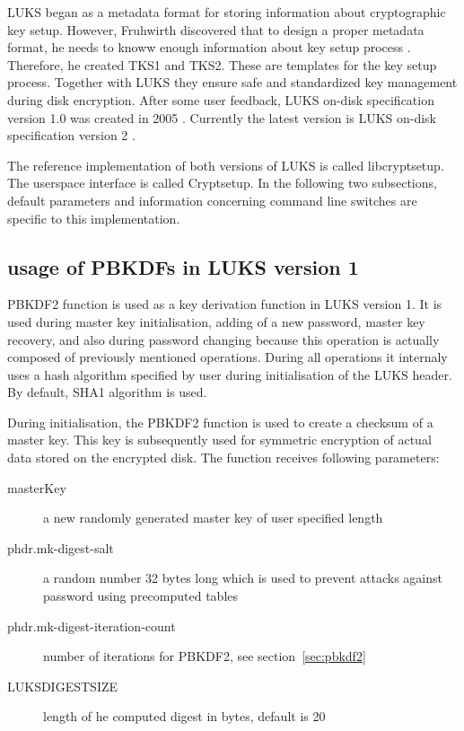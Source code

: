 \documentclass[nolof]{fithesis3}
\begin{document}
LUKS began as a metadata format for storing information about cryptographic key setup. However, Fruhwirth discovered that to design a proper metadata format, he needs to knoww enough information about key setup process \parencite{newmethods}. Therefore, he created TKS1 and TKS2. These are templates for the key setup process. Together with LUKS they ensure safe and standardized key management during disk encryption. After some user feedback, LUKS on-disk specification version 1.0 was created in 2005 \parencite{luks1}. Currently the latest version is LUKS on-disk specification version 2 \parencite{luks2}.

The reference implementation of both versions of LUKS is called libcryptsetup. The userspace interface is called Cryptsetup. In the following two subsections, default parameters and information concerning command line switches are specific to this implementation.

\subsection{usage of PBKDFs in LUKS version 1}
\label{luks1}
PBKDF2 function is used as a key derivation function in LUKS version 1. It is used during master key initialisation, adding of a new password, master key recovery, and also during password changing because this operation is actually composed of previously mentioned operations. During all operations it internaly uses a hash algorithm specified by user during initialisation of the LUKS header. By default, SHA1 algorithm is used.

During initialisation, the PBKDF2 function is used to create a checksum of a master key. This key is subsequently used for symmetric encryption of actual data stored on the encrypted disk. The function receives following parameters:

\begin{description}
\item[masterKey] a new randomly generated master key of user specified length

\item[phdr.mk-digest-salt] a random number 32 bytes long which is used to prevent attacks against password using precomputed tables \parencite[see][section 5.6.3]{itmc14}

\item[phdr.mk-digest-iteration-count] number of iterations for PBKDF2, see section~\ref{sec:pbkdf2}

\item[LUKS\-DIGEST\-SIZE] length of he computed digest in bytes, default is 20
\end{description}
\end{document}
